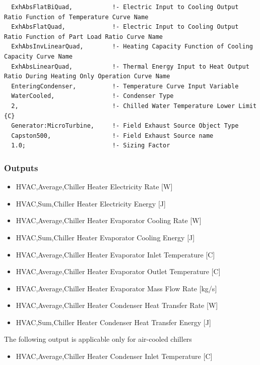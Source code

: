 \begin{lstlisting}
  ExhAbsFlatBiQuad,           !- Electric Input to Cooling Output Ratio Function of Temperature Curve Name
  ExhAbsFlatQuad,             !- Electric Input to Cooling Output Ratio Function of Part Load Ratio Curve Name
  ExhAbsInvLinearQuad,        !- Heating Capacity Function of Cooling Capacity Curve Name
  ExhAbsLinearQuad,           !- Thermal Energy Input to Heat Output Ratio During Heating Only Operation Curve Name
  EnteringCondenser,          !- Temperature Curve Input Variable
  WaterCooled,                !- Condenser Type
  2,                          !- Chilled Water Temperature Lower Limit {C}
  Generator:MicroTurbine,     !- Field Exhaust Source Object Type
  Capston500,                 !- Field Exhaust Source name
  1.0;                        !- Sizing Factor
\end{lstlisting}

\subsubsection{Outputs}\label{outputs-9-005}

\begin{itemize}
    \item
    HVAC,Average,Chiller Heater Electricity Rate {[}W{]}
    \item
    HVAC,Sum,Chiller Heater Electricity Energy {[}J{]}
    \item
    HVAC,Average,Chiller Heater Evaporator Cooling Rate {[}W{]}
    \item
    HVAC,Sum,Chiller Heater Evaporator Cooling Energy {[}J{]}
    \item
    HVAC,Average,Chiller Heater Evaporator Inlet Temperature {[}C{]}
    \item
    HVAC,Average,Chiller Heater Evaporator Outlet Temperature {[}C{]}
    \item
    HVAC,Average,Chiller Heater Evaporator Mass Flow Rate {[}kg/s{]}
    \item
    HVAC,Average,Chiller Heater Condenser Heat Transfer Rate {[}W{]}
    \item
    HVAC,Sum,Chiller Heater Condenser Heat Transfer Energy {[}J{]}
\end{itemize}

The following output is applicable only for air-cooled chillers

\begin{itemize}
    \tightlist
    \item
    HVAC,Average,Chiller Heater Condenser Inlet Temperature {[}C{]}
\end{itemize}


